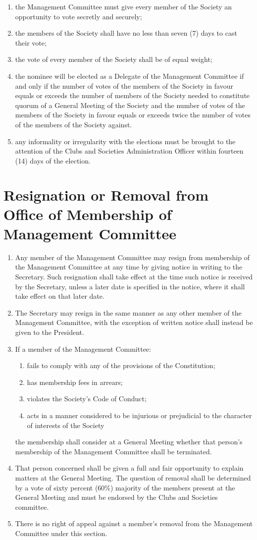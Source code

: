 \documentclass[a4paper]{article}
\newcommand*{\sectionr}[1]{{\raggedright \section{#1}}}
\begin{document}
\begin{enumerate}
\begin{enumerate}
	\item the Management Committee must give every member of the Society an opportunity to vote secretly and securely;
	\item the members of the Society shall have no less than seven (7) days to cast their vote;
	\item the vote of every member of the Society shall be of equal weight;
	\item the nominee will be elected as a Delegate of the Management Committee if and only if the number of votes of the members of the Society in favour equals or exceeds the number of members of the Society needed to constitute quorum of a General Meeting of the Society and the number of votes of the members of the Society in favour equals or exceeds twice the number of votes of the members of the Society against.
	\item any informality or irregularity with the elections must be brought to the attention of the Clubs and Societies Administration Officer within fourteen (14) days of the election.
	\end{enumerate}
\end{enumerate}

\sectionr{Resignation or Removal from Office of Membership of Management Committee}
\begin{enumerate}
\item Any member of the Management Committee may resign from membership of the Management Committee at any time by giving notice in writing to the Secretary. Such resignation shall take effect at the time such notice is received by the Secretary, unless a later date is specified in the notice, where it shall take effect on that later date.
\item The Secretary may resign in the same manner as any other member of the Management Committee, with the exception of written notice shall instead be given to the President.
\item If a member of the Management Committee:
	\begin{enumerate}
	\item fails to comply with any of the provisions of the Constitution;
	\item has membership fees in arrears;
	\item violates the Society's Code of Conduct;
	\item acts in a manner considered to be injurious or prejudicial to the character of interests of the Society
	\end{enumerate}
the membership shall consider at a General Meeting whether that person's membership of the Management Committee shall be terminated.
\item That person concerned shall be given a full and fair opportunity to explain matters at the General Meeting. The question of removal shall be determined by a vote of sixty percent (60\%) majority of the members present at the General Meeting and must be endorsed by the Clubs and Societies committee.
\item There is no right of appeal against a member's removal from the Management Committee under this section.
\end{enumerate}
\end{document}
